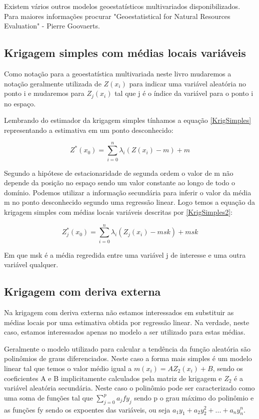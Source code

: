 Existem vários outros modelos geoestatísticos multivariados disponibilizados. Para maiores informações procurar "Geoestatistical for Natural Resources Evaluation" - Pierre Goovaerts. 

\subsection{Krigagem simples com médias locais variáveis}

Como notação para a geoestatística multivariada neste livro mudaremos a notação geralmente utilizada de $Z(x_{i})$ para indicar uma variável aleatória no ponto i e mudaremos para $Z_{j}(x_{i})$ tal que j é o índice da variável para o ponto i no espaço.

Lembrando do estimador da krigagem simples tínhamos a equação \eqref{KrigSimples} representando a estimativa em um ponto desconhecido:

\begin{equation}\label{KrigSimples}
	 Z^*(x_0) = \sum_{i=0}^{n} \lambda_{i}\left( Z(x_i) - m \right) + m
\end{equation}

Segundo a hipótese de estacionaridade de segunda ordem o valor de m não depende da posição no espaço sendo um valor constante ao longo de todo o domínio. Podemos utilizar a informação secundária para inferir o valor da média m no ponto desconhecido segundo uma regressão linear. Logo temos a equação da krigagem simples com médias locais variáveis descritas por \eqref{KrigSimples2}:

\begin{equation}\label{KrigSimples2}
Z^*_{j}(x_0) = \sum_{i=0}^{n} \lambda_{i}\left( Z_{j}(x_i) - msk \right) + msk
\end{equation}
 
 Em que msk é a média regredida entre uma variável j de interesse e uma outra variável qualquer. 
 
 \subsection{Krigagem com deriva externa}
 
 Na krigagem com deriva externa não estamos interessados em substituir as médias locais por uma estimativa obtida por regressão linear. Na verdade, neste caso, estamos interessados apenas no modelo a ser utilizado para estas médias. 
 
 Geralmente o modelo utilizado para calcular a tendência da função aleatória são polinômios de graus diferenciados. Neste caso a forma mais simples é um modelo linear tal que temos o valor médio igual a $m(x_{i}) = A Z_2(x_{i}) + B$, sendo os coeficientes A e B implicitamente calculados pela matriz de krigagem e $Z_2$ é a variável aleatória secundária. Neste caso o polinômio pode ser caracterizado como uma soma de funções tal que $\sum_{j=0}^{p} a_{j} fy_{j}$ sendo p o grau máximo do polinômio e as funções fy sendo os expoentes das variáveis, ou seja $a_1 y_1 + a_2 y^2_2 + ... + a_n y^n_n$.
 
